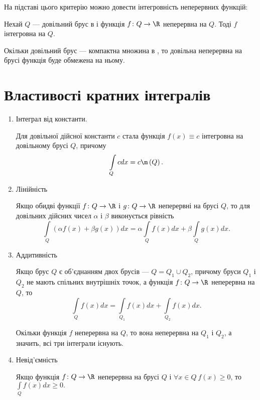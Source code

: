 На підставі цього критерію можно довести інтегровність неперервних функ\-цій:
\begin{theorem}
Нехай $Q$ --- довільний брус в  і функція ${f\colon Q\to\R}$ неперервна на $Q$. Тоді $f$ інтегровна на $Q$.
\end{theorem}
\begin{remark}
Окільки довільний брус --- компактна множина в , то довільна неперервна на брусі функція буде обмежена на ньому.
\end{remark}

\section{Властивості кратних інтегралів}
\begin{enumerate}
\item Інтеграл від константи.
\begin{intextProposition}
Для довільної дійсної константи $c$ стала функція ${f(x) \equiv c}$ інтегровна на довільному брусі $Q$, причому
\[
\int\limits_{Q} c d x = c\m\left(Q\right).
\]
\end{intextProposition}
\item Лінійність
\begin{intextProposition}
Якщо обидві функції ${f\colon Q \to \R}$ і ${g\colon Q \to \R}$ неперервні на брусі $Q$, то для довільних дійсних чисел $\alpha$ і $\beta$ виконується рівність
\[
\int\limits_{Q} \left(\alpha f(x) + \beta g(x)\right)d x = \alpha\int\limits_{Q} f(x) d x + \beta\int\limits_{Q} g(x) d x.
\]
\end{intextProposition}
\item Аддитивність
\begin{intextProposition}
Якщо брус $Q$ є об'єднанням двох брусів --- ${Q = Q_1 \cup Q_2}$, причому бруси $Q_1$ і $Q_2$ не мають спільних внутрішніх точок, а функція ${f\colon Q \to \R}$ неперервна на $Q$, то
\[
\int\limits_{Q} f(x) d x = \int\limits_{Q_1} f(x) d x + \int\limits_{Q_2} f(x) d x.
\]
\end{intextProposition}
\begin{remark}
Окільки функція ${f}$ неперервна на $Q$, то вона неперервна на $Q_1$ і $Q_2$, а значить, всі три інтеграли існують.
\end{remark}
\item Невід'ємність
\begin{intextProposition}
Якщо функція ${f\colon Q \to \R}$ неперервна на брусі $Q$ і ${\forall x\in Q\ f(x)\geq 0}$, то ${\int\limits_{Q} f(x) d x \geq 0.}$

\end{intextProposition}
\end{enumerate}
